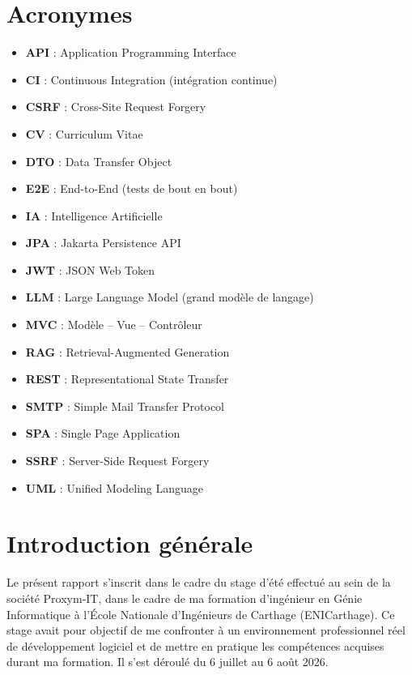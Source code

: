 \documentclass[12pt,a4paper]{report}
\begin{document}
\chapter*{Acronymes}
\begin{itemize}[label=---]
  \item \textbf{API} : Application Programming Interface
  \item \textbf{CI} : Continuous Integration (intégration continue)
  \item \textbf{CSRF} : Cross-Site Request Forgery
  \item \textbf{CV} : Curriculum Vitae
  \item \textbf{DTO} : Data Transfer Object
  \item \textbf{E2E} : End-to-End (tests de bout en bout)
  \item \textbf{IA} : Intelligence Artificielle
  \item \textbf{JPA} : Jakarta Persistence API
  \item \textbf{JWT} : JSON Web Token
  \item \textbf{LLM} : Large Language Model (grand modèle de langage)
  \item \textbf{MVC} : Modèle -- Vue -- Contrôleur
  \item \textbf{RAG} : Retrieval-Augmented Generation
  \item \textbf{REST} : Representational State Transfer
  \item \textbf{SMTP} : Simple Mail Transfer Protocol
  \item \textbf{SPA} : Single Page Application
  \item \textbf{SSRF} : Server-Side Request Forgery
  \item \textbf{UML} : Unified Modeling Language
\end{itemize}

\clearpage
\pagestyle{fancy}

\chapter*{Introduction générale}

Le présent rapport s'inscrit dans le cadre du stage d'été effectué au sein de la société Proxym-IT, dans le cadre de ma formation d'ingénieur en Génie Informatique à l'École Nationale d'Ingénieurs de Carthage (ENICarthage). Ce stage avait pour objectif de me confronter à un environnement professionnel réel de développement logiciel et de mettre en pratique les compétences acquises durant ma formation. Il s'est déroulé du 6 juillet au 6 août 2026.
\end{document}
